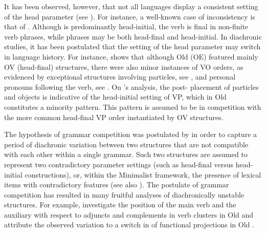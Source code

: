 \documentclass[output=paper,modfonts,newtxmath,hidelinks]{langscibook}
\begin{document}
It has been observed, however, that not all languages display a consistent setting of the head parameter (see \citealt{Hawkins1980,Hawkins1982}). For instance, a well-known case of inconsistency is that of . Although  is predominantly head-initial, the verb is final in non-finite verb phrases, while  phrases may be both head-final and head-initial. In diachronic studies, it has been postulated that the setting of the head parameter may switch in language history. For instance, \citet{pintzuk1991}
shows that although Old  (OE) featured mainly OV (head-final) structures, there were also minor instances of VO orders, as evidenced by exceptional structures involving particles, see , and personal pronouns following the verb, see .
\ea \label{11:ex1}
	\z 
\z
On \citeauthor{pintzuk1991}’s analysis, the post- placement of particles and objects is indicative of the head-initial setting of VP, which in Old  constitutes a minority pattern. This pattern is assumed to be in competition with the more common head-final VP order instantiated by OV structures.

The hypothesis of grammar competition was postulated by \citet{kroch1989} in order to capture a period of diachronic variation between two structures that are not compatible with each other within a single grammar. Such two structures are assumed to represent two contradictory parameter settings (such as head-final versus head-initial constructions), or, within the Minimalist framework, the presence of lexical items with contradictory features (see also \citealt[278]{pintzuk2002}). The postulate of grammar competition has resulted in many fruitful analyses of diachronically unstable structures. For example, \citet{haeberli-pintzuk2006} investigate the position of the main verb and the auxiliary with respect to adjuncts and complements in verb clusters in Old  and attribute the observed  variation to a switch in  of functional projections in Old .
\end{document}
